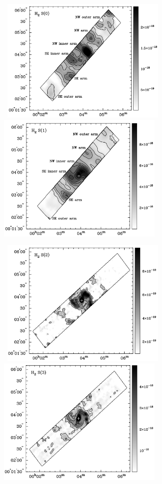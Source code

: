 \documentclass[manuscript]{aastex}
\begin{document}
\begin{figure}[!t]
\centerline{\hbox{ \hspace{0.0in} 
\includegraphics[width=8cm,angle=0]{bw_h2s0_contours.jpg}
\hspace{0.1in}
\includegraphics[width=8cm,angle=0]{bw_h2s1_contours.jpg}}}
\end{figure}
\begin{figure}[!h]
\centerline{\hbox{\hspace{0.0in}
\includegraphics[width=8cm,angle=0]{bw_h2s2_contours.jpg}
\hspace{0.1in}
\includegraphics[width=8cm,angle=0]{bw_h2s3_contours.jpg}}}
\end{figure}
\end{document}
